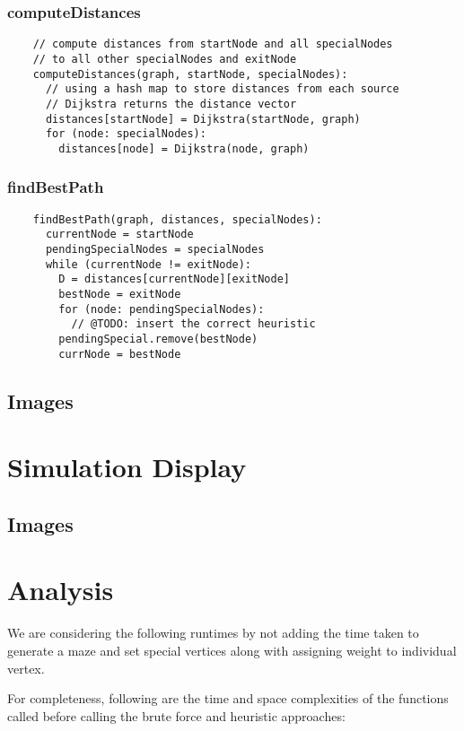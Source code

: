 \documentclass[12pt]{report}
\begin{document}
\subsection{computeDistances}
\begin{tcolorbox}
\begin{verbatim}
    // compute distances from startNode and all specialNodes
    // to all other specialNodes and exitNode
    computeDistances(graph, startNode, specialNodes):
      // using a hash map to store distances from each source
      // Dijkstra returns the distance vector
      distances[startNode] = Dijkstra(startNode, graph)
      for (node: specialNodes):
        distances[node] = Dijkstra(node, graph)
\end{verbatim}
\end{tcolorbox}

\subsection{findBestPath}
\begin{tcolorbox}
\begin{verbatim}
    findBestPath(graph, distances, specialNodes):
      currentNode = startNode
      pendingSpecialNodes = specialNodes
      while (currentNode != exitNode):
        D = distances[currentNode][exitNode]
        bestNode = exitNode
        for (node: pendingSpecialNodes):
          // @TODO: insert the correct heuristic
        pendingSpecial.remove(bestNode)
        currNode = bestNode
\end{verbatim}
\end{tcolorbox}
\section{Images} %

\chapter{Simulation Display} %
\section{Images}


\chapter{Analysis} %
We are considering the following runtimes by not adding the time taken to generate a maze and set special vertices along with assigning weight to individual vertex.\par %
For completeness, following are the time and space complexities of the functions called before calling the brute force and heuristic approaches:
\end{document}
